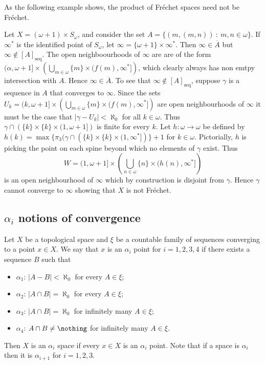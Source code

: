 \documentclass{article}
\newcommand{\seqcl}[1]{{[#1]_{\text{seq}}}}
\begin{document}
As the following example shows, the product of Fréchet spaces need not be Fréchet.
\begin{exam}
    Let \(X = (\omega + 1) \times S_\omega\), and consider the set \(A = \{(m, (m, n))\: : \:  m, n \in \omega\}\). If \(\infty^{\ast}\) is the identified point of \(S_{\omega}\), let \(\infty = \{\omega + 1\} \times \infty^{\ast}\). Then \(\infty \in \overline{A}\) but \(\infty \not \in \seqcl{A}\). The open neighboourhoods of \(\infty\) are are of the form \((\alpha, \omega + 1] \times\left(\bigcup_{m \in \omega}\{m\} \times (f(m), \infty^{\ast}]\right)\), which clearly always has non emtpy intersection with \(A\). Hence \(\infty \in \overline{A}\). To see that \(\infty \not \in \seqcl{A}\), suppose \(\gamma\) is a sequence in \(A\) that converges to \(\infty\). Since the sets \(U_k = (k, \omega + 1] \times\left(\bigcup_{m \in \omega}\{m\} \times (f(m), \infty^{\ast}]\right)\) are open neighbourhoods of \(\infty\) it must be the case that \(|\gamma - U_k | < \aleph_0\) for all \(k \in \omega\). Thus  \(\gamma\cap\left(\{k\}\times\{k\}\times(1,\omega + 1]\right)\) is finite for every \(k\). Let \(h:\omega \to \omega\) be defined by \(h(k) = \max\{\pi_3(\gamma\cap\left(\{k\}\times\{k\}\times(1,\infty^{\ast}]\right)\} + 1\) for \(k \in \omega\). Pictorially, \(h\) is picking the point on each spine beyond which no elements of \(\gamma\) exist. Thus 
    \[
    W = (1, \omega + 1] \times\left(\bigcup_{n \in \omega}\{n\}\times(h(n), \infty^{\ast}]\right)
    \] 
    is an open neighbourhood of \(\infty\) which by construction is disjoint from \(\gamma\). Hence \(\gamma\) cannot converge to \(\infty\) showing that \(X\) is not Fréchet.
\end{exam}

\subsection{\(\alpha_i\) notions of convergence}

\begin{defn}
    Let \(X\) be a topological space and \(\xi\) be a countable family of sequences converging to a point \(x \in X\). We say that \(x\) is an \(\alpha_i\) point for \(i = 1, 2, 3, 4\) if there exists a sequence \(B\) such that 
    \begin{itemize}
        \item \(\alpha_1\):  \(|A - B| < \aleph_0\) for every \(A \in \xi\);
        \item \(\alpha_2\): \(|A \cap B| = \aleph_0\) for every \(A \in \xi\);
        \item \(\alpha_3\): \(|A \cap B| = \aleph_0\) for infinitely many \(A \in \xi\);
        \item \(\alpha_4\): \(A \cap B \neq \nothing\) for infinitely many \(A \in \xi\).
    \end{itemize}
    Then \(X\) is an \(\alpha_i\) space if every \(x \in X\) is an \(\alpha_i\) point. Note that if a space is \(\alpha_i\) then it is \(\alpha_{i + 1}\) for \(i =1, 2, 3\).
\end{defn}
\end{document}
